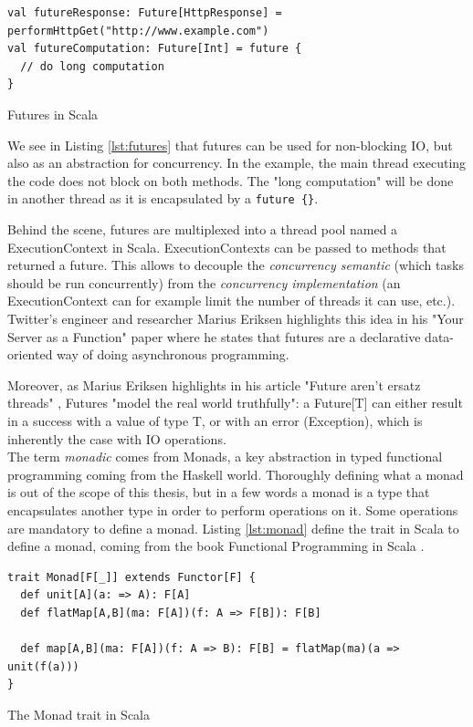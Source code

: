 \begin{listing}[h]
\begin{verbatim}
val futureResponse: Future[HttpResponse] = performHttpGet("http://www.example.com")
val futureComputation: Future[Int] = future {
  // do long computation
}
\end{verbatim}
\caption{Futures in Scala}
\label{lst:futures}
\end{listing}

We see in Listing \ref{lst:futures} that futures can be used for non-blocking IO, but also as an abstraction for concurrency. In the example, the main thread
executing the code does not block on both methods. The "long computation" will be done in another thread as it is encapsulated by a \verb|future {}|.

Behind the scene, futures are multiplexed into a thread pool named a ExecutionContext in Scala. ExecutionContexts can be passed to methods that returned a future.
This allows to decouple the \textit{concurrency semantic} (which tasks should be run concurrently) from the \textit{concurrency implementation} (an ExecutionContext
can for example limit the number of threads it can use, etc.). Twitter's engineer and researcher Marius Eriksen highlights this idea in his 
"Your Server as a Function" paper  where he states that futures are a declarative data-oriented way of doing asynchronous programming.

Moreover, as Marius Eriksen highlights in his article "Future aren't ersatz threads" , Futures "model the real world truthfully": 
a Future[T] can either result in a success with a value of type T, or with an error (Exception), which is inherently the case with IO operations.
\\

The term \textit{monadic} comes from Monads, a key abstraction in typed functional programming coming from the Haskell world. Thoroughly defining what a monad
is out of the scope of this thesis, but in a few words a monad is a type that encapsulates another type in order to perform operations on it. Some operations
are mandatory to define a monad. Listing \ref{lst:monad} define the trait in Scala to define a monad, coming from the book Functional Programming in Scala
. 

\begin{listing}[h]
\begin{verbatim}
trait Monad[F[_]] extends Functor[F] {
  def unit[A](a: => A): F[A]
  def flatMap[A,B](ma: F[A])(f: A => F[B]): F[B]

  def map[A,B](ma: F[A])(f: A => B): F[B] = flatMap(ma)(a => unit(f(a)))
}
\end{verbatim}
\caption{The Monad trait in Scala}
\label{lst:monad}
\end{listing}

